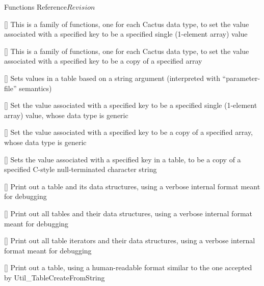 \begin{cactuspart}{ Functions Reference}{}{$Revision$}
\begin{Lentry}
\item[\code{Util\_TableSet*}]
     [\pageref{Util-TableSet*}]
This is a family of functions, one for each Cactus data type,
to set the value associated with a specified key to be a specified
single (1-element array) value

\item[\code{Util\_TableSet*Array}]
     [\pageref{Util-TableSet*Array}]
This is a family of functions, one for each Cactus data type,
to set the value associated with a specified key to be a copy
of a specified array

\item[\code{Util\_TableSetFromString}]
     [\pageref{Util-TableSetFromString}]
Sets values in a table based on a string argument (interpreted with
``parameter-file'' semantics)

\item[\code{Util\_TableSetGeneric}]
     [\pageref{Util-TableSetGeneric}]
Set the value associated with a specified key to be a specified
single (1-element array) value, whose data type is generic

\item[\code{Util\_TableSetGenericArray}]
     [\pageref{Util-TableSetGenericArray}]
Set the value associated with a specified key to be a copy of a
specified array, whose data type is generic

\item[\code{Util\_TableSetString}]
     [\pageref{Util-TableSetString}]
Sets the value associated with a specified key in a table, to be
a copy of a specified C-style null-terminated character string

\item[\code{Util\_TablePrint}]
     [\pageref{Util-TablePrint}]
Print out a table and its data structures, using a verbose internal
format meant for debugging

\item[\code{Util\_TablePrintAll}]
     [\pageref{Util-TablePrintAll}]
Print out all tables and their data structures, using a verbose
internal format meant for debugging

\item[\code{Util\_TablePrintAllIterators}]
     [\pageref{Util-TablePrintAllIterators}]
Print out all table iterators and their data structures, using a
verbose internal format meant for debugging

\item[\code{Util\_TablePrintPretty}]
     [\pageref{Util-TablePrintPretty}]
Print out a table, using a human-readable format similar to the one
accepted by Util\_TableCreateFromString


\end{Lentry}
\end{cactuspart}
